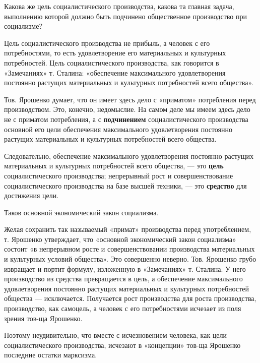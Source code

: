 \documentclass[12pt, a4paper, openany]{book}
\begin{document}
Какова же цель социалистического производства, какова та главная задача, выполнению которой должно быть подчинено общественное производство при социализме?



Цель социалистического производства не прибыль, а человек с его потребностями, то есть удовлетворение его материальных и культурных потребностей. Цель социалистического производства, как говорится в «Замечаниях» т. Сталина: «обеспечение максимального удовлетворения постоянно растущих материальных и культурных потребностей всего общества».



Тов. Ярошенко думает, что он имеет здесь дело с «приматом» потребления перед производством. Это, конечно, недомыслие. На самом деле мы имеем здесь дело не с приматом потребления, а с \textbf{подчинением} социалистического производства основной его цели обеспечения максимального удовлетворения постоянно растущих материальных и культурных потребностей всего общества.



Следовательно, обеспечение максимального удовлетворения постоянно растущих материальных и культурных потребностей всего общества, — это \textbf{цель} социалистического производства; непрерывный рост и совершенствование социалистического производства на базе высшей техники, — это \textbf{средство} для достижения цели.



Таков основной экономический закон социализма.



Желая сохранить так называемый «примат» производства перед употреблением, т. Ярошенко утверждает, что «основной экономический закон социализма» состоит «в непрерывном росте и совершенствовании производства материальных и культурных условий общества». Это совершенно неверно. Тов. Ярошенко грубо извращает и портит формулу, изложенную в «Замечаниях» т. Сталина. У него производство из средства превращается в цель, а обеспечение максимального удовлетворения постоянно растущих материальных и культурных потребностей общества — исключается. Получается рост производства для роста производства, производство, как самоцель, а человек с его потребностями исчезает из поля зрения тов-ща Ярошенко.



Поэтому неудивительно, что вместе с исчезновением человека, как цели социалистического производства, исчезают в «концепции» тов-ща Ярошенко последние остатки марксизма.
\end{document}
